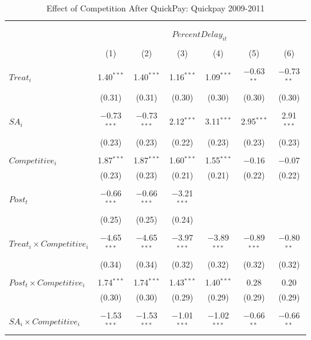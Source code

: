 \documentclass[
]{article}
\begin{document}
\begin{table}[H] \centering 
  \caption{Effect of Competition After QuickPay: Quickpay 2009-2011} 
  \label{} 
\small 
\begin{tabular}{@{\extracolsep{-3pt}}lcccccc} 
\\[-1.8ex]\hline 
\hline \\[-1.8ex] 
\\[-1.8ex] & \multicolumn{6}{c}{$PercentDelay_{it}$  } \\ 
\\[-1.8ex] & (1) & (2) & (3) & (4) & (5) & (6)\\ 
\hline \\[-1.8ex] 
 $Treat_i$ & 1.40$^{***}$ & 1.40$^{***}$ & 1.16$^{***}$ & 1.09$^{***}$ & $-$0.63$^{**}$ & $-$0.73$^{**}$ \\ 
  & (0.31) & (0.31) & (0.30) & (0.30) & (0.30) & (0.30) \\ 
  & & & & & & \\ 
 $SA_i$ & $-$0.73$^{***}$ & $-$0.73$^{***}$ & 2.12$^{***}$ & 3.11$^{***}$ & 2.95$^{***}$ & 2.91$^{***}$ \\ 
  & (0.23) & (0.23) & (0.22) & (0.23) & (0.23) & (0.23) \\ 
  & & & & & & \\ 
 $Competitive_i$ & 1.87$^{***}$ & 1.87$^{***}$ & 1.60$^{***}$ & 1.55$^{***}$ & $-$0.16 & $-$0.07 \\ 
  & (0.23) & (0.23) & (0.21) & (0.21) & (0.22) & (0.22) \\ 
  & & & & & & \\ 
 $Post_t$ & $-$0.66$^{***}$ & $-$0.66$^{***}$ & $-$3.21$^{***}$ &  &  &  \\ 
  & (0.25) & (0.25) & (0.24) &  &  &  \\ 
  & & & & & & \\ 
 $Treat_i \times Competitive_i$ & $-$4.65$^{***}$ & $-$4.65$^{***}$ & $-$3.97$^{***}$ & $-$3.89$^{***}$ & $-$0.89$^{***}$ & $-$0.80$^{**}$ \\ 
  & (0.34) & (0.34) & (0.32) & (0.32) & (0.32) & (0.32) \\ 
  & & & & & & \\ 
 $Post_t \times Competitive_i$ & 1.74$^{***}$ & 1.74$^{***}$ & 1.43$^{***}$ & 1.40$^{***}$ & 0.28 & 0.20 \\ 
  & (0.30) & (0.30) & (0.29) & (0.29) & (0.29) & (0.29) \\ 
  & & & & & & \\ 
 $SA_i \times Competitive_i$ & $-$1.53$^{***}$ & $-$1.53$^{***}$ & $-$1.01$^{***}$ & $-$1.02$^{***}$ & $-$0.66$^{**}$ & $-$0.66$^{**}$ \\ 

\end{tabular}
\end{table}
\end{document}
